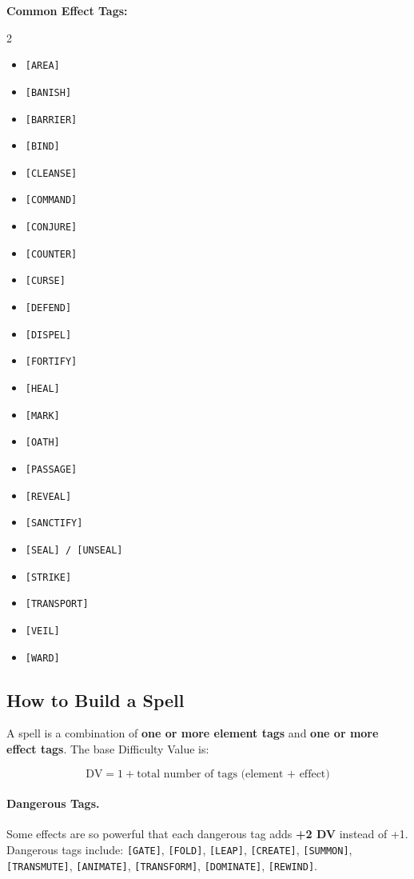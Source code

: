 \textbf{Common Effect Tags:}
\begin{multicols}{2}
\begin{itemize}[leftmargin=*]
  \item \texttt{[AREA]}
  \item \texttt{[BANISH]}
  \item \texttt{[BARRIER]}
  \item \texttt{[BIND]}
  \item \texttt{[CLEANSE]}
  \item \texttt{[COMMAND]}
  \item \texttt{[CONJURE]}
  \item \texttt{[COUNTER]}
  \item \texttt{[CURSE]}
  \item \texttt{[DEFEND]}
  \item \texttt{[DISPEL]}
  \item \texttt{[FORTIFY]}
  \item \texttt{[HEAL]}
  \item \texttt{[MARK]}
  \item \texttt{[OATH]}
  \item \texttt{[PASSAGE]}
  \item \texttt{[REVEAL]}
  \item \texttt{[SANCTIFY]}
  \item \texttt{[SEAL] / [UNSEAL]}
  \item \texttt{[STRIKE]}
  \item \texttt{[TRANSPORT]}
  \item \texttt{[VEIL]}
  \item \texttt{[WARD]}
\end{itemize}
\end{multicols}

\subsection{How to Build a Spell}
A spell is a combination of \textbf{one or more element tags} and \textbf{one or more effect tags}. The base Difficulty Value is:

\[
\boxed{\text{DV} = 1 + \text{total number of tags (element + effect)}}
\]

\paragraph{Dangerous Tags.}
Some effects are so powerful that each dangerous tag adds \textbf{+2 DV} instead of +1. Dangerous tags include: \texttt{[GATE]}, \texttt{[FOLD]}, \texttt{[LEAP]}, \texttt{[CREATE]}, \texttt{[SUMMON]}, \texttt{[TRANSMUTE]}, \texttt{[ANIMATE]}, \texttt{[TRANSFORM]}, \texttt{[DOMINATE]}, \texttt{[REWIND]}.

